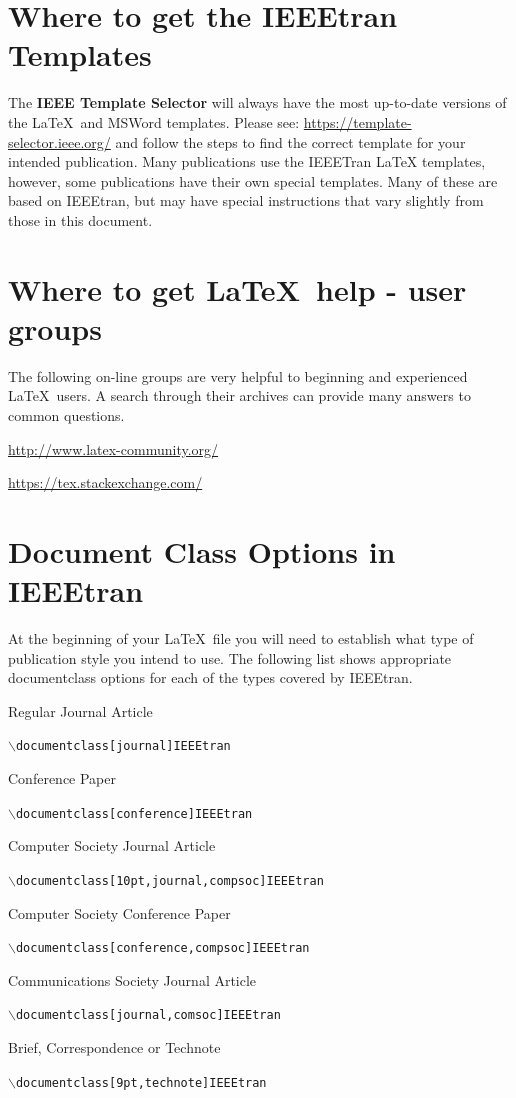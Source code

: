 \documentclass[lettersize,journal]{IEEEtran} %
\begin{document}
  

\section{Where to get the IEEEtran Templates}
\noindent The {\bf{IEEE Template Selector}} will always have the most up-to-date versions of the \LaTeX\ and MSWord templates. Please see: \url{https://template-selector.ieee.org/} and follow the steps to find the correct template for your intended publication. Many publications use the IEEETran LaTeX templates, however, some publications have their own special templates. Many of these are  based on IEEEtran, but may have special instructions that vary slightly from those in this document.

\section{Where to get \LaTeX \ help - user groups}
\noindent The following on-line groups are very helpful to beginning and experienced \LaTeX\ users. A search through their archives can provide many answers to common questions.
\begin{list}{}{}
\item{\url{http://www.latex-community.org/}} 
\item{\url{https://tex.stackexchange.com/} }
\end{list}

\section{Document Class Options in IEEEtran}
\noindent At the beginning of your \LaTeX\ file you will need to establish what type of publication style you intend to use. The following list shows appropriate documentclass options for each of the types covered by IEEEtran.

\begin{list}{}{}
\item{Regular Journal Article}
\item{{\tt{$\backslash$documentclass[journal]{IEEEtran}}}}\\
\item{{Conference Paper}}
\item{{\tt{$\backslash$documentclass[conference]{IEEEtran}}}}\\
\item{Computer Society Journal Article}
\item{{\tt{$\backslash$documentclass[10pt,journal,compsoc]{IEEEtran}}}}\\
\item{Computer Society Conference Paper}
\item{{\tt{$\backslash$documentclass[conference,compsoc]{IEEEtran}}}}\\
\item{{Communications Society Journal Article}}
\item{{\tt{$\backslash$documentclass[journal,comsoc]{IEEEtran}}}}\\
\item{{Brief, Correspondence or Technote}}
\item{{\tt{$\backslash$documentclass[9pt,technote]{IEEEtran}}}}
\end{list}
\end{document}

